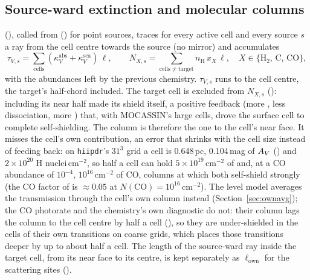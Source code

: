 \subsection{Source-ward extinction and molecular columns}
\label{sec:avradial}

 (), called from
 () for point sources, traces for every
active cell and every source $s$ a ray from the cell centre towards the
source (no mirror) and accumulates
\begin{equation}
  \tau_{V,s} = \sum_{\mathrm{cells}} (\kappa^{\mathrm{abs}}_V+\kappa^{\mathrm{sca}}_V)\,\ell,
  \qquad
  N_{X,s} = \sum_{\mathrm{cells}\neq\mathrm{target}} n_{\mathrm H}\, x_X\,\ell,
  \quad X\in\{\mathrm{H_2},\,\mathrm C,\,\mathrm{CO}\},
\end{equation}
with the abundances left by the previous chemistry. $\tau_{V,s}$ runs to the
cell centre, the target's half-chord included. The target cell is excluded
from $N_{X,s}$ (): including its near half made its \Htwo{}
shield itself, a positive feedback (more \Htwo, less dissociation, more \Htwo)
that, with MOCASSIN's large cells, drove the surface cell to complete
self-shielding. The column is therefore the one to the cell's near face. It
misses the cell's own contribution, an error that shrinks with the cell size
instead of feeding back: on \texttt{hiipdr}'s $31^3$ grid a cell is 0.648\,pc,
0.104\,mag of $A_{V}$ () and $2\times10^{20}$ H nuclei\,cm$^{-2}$, so
half a cell can hold $5\times10^{19}$\,cm$^{-2}$ of \Htwo{} and, at a CO
abundance of $10^{-4}$, $10^{16}$\,cm$^{-2}$ of CO, columns at which both
self-shield strongly (the CO factor of \citealt{vanDishoeckBlack1988} is
$\approx0.05$ at $N(\mathrm{CO})=10^{16}$\,cm$^{-2}$). The level model averages the transmission through the cell's own
column instead (Section~\ref{sec:ownavg}); the CO photorate and the
chemistry's own \Htwo{} diagnostic do not: their column lags the column to
the cell centre by half a cell (), so they are under-shielded in
the cells of their own transitions on coarse grids, which places those
transitions deeper by up to about half a cell. The length of the source-ward ray inside
the target cell, from its near face to its centre, is kept separately as
$\ell_{\mathrm{own}}$ for the scattering sites ().

